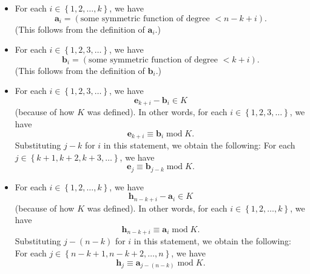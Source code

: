 \documentclass[numbers=enddot,12pt,final,onecolumn,notitlepage]{scrartcl}%
\theoremstyle{definition}
\begin{document}
\begin{itemize}
\item For each $i\in\left\{  1,2,\ldots,k\right\}  $, we have%
\begin{equation}
\mathbf{a}_{i}=\left(  \text{some symmetric function of degree }<n-k+i\right)
. \label{eq.thm.bigquot.ai-deg}%
\end{equation}
(This follows from the definition of $\mathbf{a}_{i}$.)

\item For each $i\in\left\{  1,2,3,\ldots\right\}  $, we have%
\begin{equation}
\mathbf{b}_{i}=\left(  \text{some symmetric function of degree }<k+i\right)  .
\label{eq.thm.bigquot.bi-deg}%
\end{equation}
(This follows from the definition of $\mathbf{b}_{i}$.)

\item For each $i\in\left\{  1,2,3,\ldots\right\}  $, we have%
\begin{equation}
\mathbf{e}_{k+i}-\mathbf{b}_{i}\in K \label{eq.thm.bigquot.ek+iinK}%
\end{equation}
(because of how $K$ was defined). In other words, for each $i\in\left\{
1,2,3,\ldots\right\}  $, we have%
\begin{equation}
\mathbf{e}_{k+i}\equiv\mathbf{b}_{i}\operatorname{mod}K.
\label{eq.thm.bigquot.ek+imodK}%
\end{equation}
Substituting $j-k$ for $i$ in this statement, we obtain the following: For
each $j\in\left\{  k+1,k+2,k+3,\ldots\right\}  $, we have%
\begin{equation}
\mathbf{e}_{j}\equiv\mathbf{b}_{j-k}\operatorname{mod}K.
\label{eq.thm.bigquot.ejmodK}%
\end{equation}


\item For each $i\in\left\{  1,2,\ldots,k\right\}  $, we have%
\begin{equation}
\mathbf{h}_{n-k+i}-\mathbf{a}_{i}\in K \label{eq.thm.bigquot.hn-k+iinK}%
\end{equation}
(because of how $K$ was defined). In other words, for each $i\in\left\{
1,2,\ldots,k\right\}  $, we have%
\begin{equation}
\mathbf{h}_{n-k+i}\equiv\mathbf{a}_{i}\operatorname{mod}K.
\label{eq.thm.bigquot.hn-k+imodK}%
\end{equation}
Substituting $j-\left(  n-k\right)  $ for $i$ in this statement, we obtain the
following: For each $j\in\left\{  n-k+1,n-k+2,\ldots,n\right\}  $, we have%
\begin{equation}
\mathbf{h}_{j}\equiv\mathbf{a}_{j-\left(  n-k\right)  }\operatorname{mod}K.
\label{eq.thm.bigquot.hjmodK}%
\end{equation}

\end{itemize}
\end{document}

